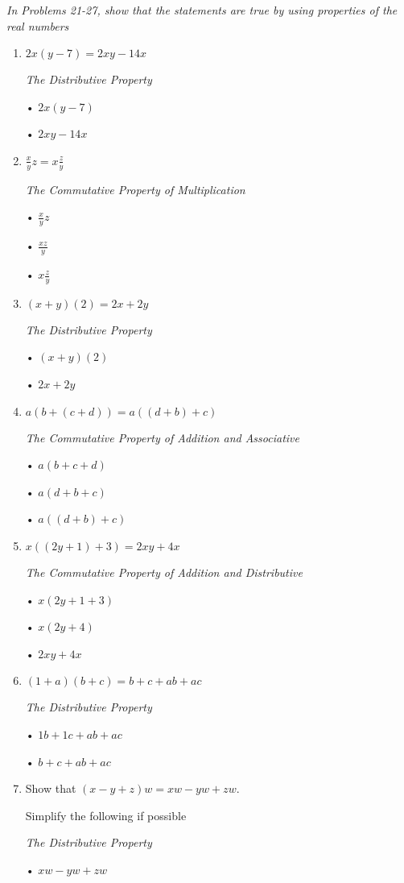 \documentclass{article}
\begin{document}
\textit{In Problems 21-27, show that the statements are true by using properties of the real numbers}
\begin{enumerate}[start=21]
    \item $2x(y-7) = 2xy - 14x$\par
    \begin{center}
        \textit{The Distributive Property}\par
        • $2x(y-7)$\par
        • $2xy - 14x$
    \end{center}

    \item $\frac{x}{y}z = x\frac{z}{y}$
    \begin{center}
        \textit{The Commutative Property of Multiplication}\par
        • $\frac{x}{y} z$\par
        • $\frac{xz}{y}$\par
        • $x \frac{z}{y}$
    \end{center}

    \item $(x + y)(2) = 2x + 2y$
    \begin{center}
        \textit{The Distributive Property}\par
        • $(x + y)(2)$\par
        • $2x + 2y$
    \end{center}
    
    \item $a(b + (c + d)) = a((d + b) + c)$
    \begin{center}
        \textit{The Commutative Property of Addition and Associative}\par
        • $a(b + c + d)$\par
        • $a(d + b + c)$\par
        • $a((d + b) + c)$
    \end{center}

    \item $x((2y + 1) + 3) = 2xy + 4x$
    \begin{center}
        \textit{The Commutative Property of Addition and Distributive}\par
        • $x(2y + 1 + 3)$\par
        • $x(2y + 4)$\par
        • $2xy + 4x$
    \end{center}
    
    \item $(1 + a)(b + c) = b + c + ab + ac$
    \begin{center}
        \textit{The Distributive Property}\par
        • $1b + 1c + ab + ac$\par
        • $b + c + ab + ac$
    \end{center}

    \item Show that $(x - y + z)w = xw - yw + zw$.\par
    [\textit{Hint: $b + c + d = (b + c) + d$}]\par
    Simplify the following if possible
    \begin{center}
        \textit{The Distributive Property}\par
        • $xw - yw + zw$
    \end{center}
\end{enumerate}
\end{document}

